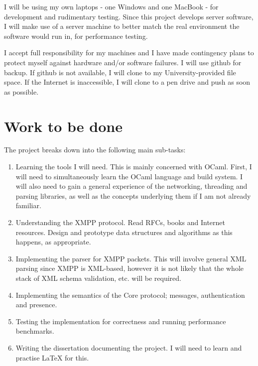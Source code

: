 \documentclass[12pt,a4paper,twoside]{article}
\begin{document}
I will be using my own laptops - one Windows and one MacBook - for development
and rudimentary testing. Since this project develops server software, I will
make use of a server machine to better match the real environment the software
would run in, for performance testing.

I accept full responsibility for my machines and I have made contingency plans
to protect myself against hardware and/or software failures. I will use github
for backup. If github is not available, I will clone to my University-provided
file space. If the Internet is inaccessible, I will clone to a pen drive and
push as soon as possible.

\section*{Work to be done}

The project breaks down into the following main sub-tasks:

\begin{enumerate}

\item Learning the tools I will need. This is mainly concerned with OCaml.
  First, I will need to simultaneously learn the OCaml language and build
  system. I will also need to gain a general experience of the networking,
  threading and parsing libraries, as well as the concepts underlying them if
  I am not already familiar.

\item Understanding the XMPP protocol. Read RFCs, books and Internet resources.
  Design and prototype data structures and algorithms as this happens, as
  appropriate.

\item Implementing the parser for XMPP packets. This will involve general XML
  parsing since XMPP is XML-based, however it is not likely that the whole
  stack of XML schema validation, etc. will be required.

\item Implementing the semantics of the Core protocol; messages, authentication
  and presence.

\item Testing the implementation for correctness and running performance
  benchmarks.

\item Writing the dissertation documenting the project. I will need to learn and
  practise LaTeX for this.

\end{enumerate}
\end{document}
